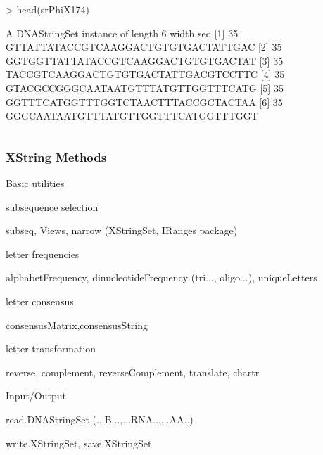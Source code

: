 \documentclass{beamer}
\begin{document}
\begin{frame}[fragile]
\begin{columns}
\begin{column}[t]{0.70\textwidth}
\begin{uncoverenv}
\begin{Schunk}
\begin{Sinput}
> head(srPhiX174)
\end{Sinput}
\begin{Soutput}
  A DNAStringSet instance of length 6
    width seq
[1]    35 GTTATTATACCGTCAAGGACTGTGTGACTATTGAC
[2]    35 GGTGGTTATTATACCGTCAAGGACTGTGTGACTAT
[3]    35 TACCGTCAAGGACTGTGTGACTATTGACGTCCTTC
[4]    35 GTACGCCGGGCAATAATGTTTATGTTGGTTTCATG
[5]    35 GGTTTCATGGTTTGGTCTAACTTTACCGCTACTAA
[6]    35 GGGCAATAATGTTTATGTTGGTTTCATGGTTTGGT
\end{Soutput}
\end{Schunk}
                \end{uncoverenv}  
            \end{column}
          \end{columns}
  \eit
\end{frame}



\begin{frame}
\frametitle{XString Methods}
  \bit
      \item Basic utilities
        \bit
            \item subsequence selection
              \bit
                  \item subseq, Views, narrow (XStringSet, IRanges package)
              \eit
            \item letter frequencies
              \bit
                  \item alphabetFrequency, dinucleotideFrequency (tri..., oligo...), uniqueLetters
              \eit
            \item letter consensus
              \bit
                  \item consensusMatrix,consensusString
              \eit 
            \item letter transformation
              \bit
                  \item reverse, complement, reverseComplement, translate, chartr
              \eit
            \item Input/Output
              \bit
                  \item read.DNAStringSet (...B...,...RNA...,..AA..)
                  \item write.XStringSet, save.XStringSet
              \eit
        \eit
  \eit
\end{frame}

\end{document}
